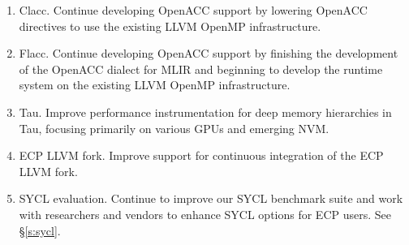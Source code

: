 \begin{enumerate}
	\item Clacc. Continue developing OpenACC support by lowering OpenACC directives to use the existing LLVM OpenMP infrastructure.
    
    \item Flacc. Continue developing OpenACC support by finishing the development of the  OpenACC dialect for MLIR and beginning to develop the runtime system on the existing LLVM OpenMP infrastructure.
    
    \item Tau. Improve performance instrumentation for deep memory hierarchies in Tau, focusing primarily on various GPUs and emerging NVM.
    
    \item ECP LLVM fork. Improve support for continuous integration of the ECP LLVM fork.

    \item SYCL evaluation. 
    Continue to improve our SYCL benchmark suite and work with researchers and vendors to enhance SYCL options for ECP users. See \S\ref{s:sycl}.

\end{enumerate}
